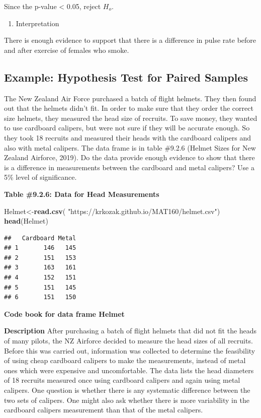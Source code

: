 \documentclass[
]{book}
\newenvironment{Shaded}{\begin{snugshade}}{\end{snugshade}}
\newcommand{\KeywordTok}[1]{\textcolor[rgb]{0.13,0.29,0.53}{\textbf{#1}}}
\newcommand{\NormalTok}[1]{#1}
\newcommand{\StringTok}[1]{\textcolor[rgb]{0.31,0.60,0.02}{#1}}
\providecommand{\tightlist}{%
  \setlength{\itemsep}{0pt}\setlength{\parskip}{0pt}}
\begin{document}
Since the p-value \textless{} 0.05, reject \(H_o\).

\begin{enumerate}
\def\labelenumi{\arabic{enumi}.}
\setcounter{enumi}{5}
\tightlist
\item
  Interpretation
\end{enumerate}

There is enough evidence to support that there is a difference in pulse rate before and after exercise of females who smoke.

\hypertarget{example-hypothesis-test-for-paired-samples-1}{%
\subsection{Example: Hypothesis Test for Paired Samples}\label{example-hypothesis-test-for-paired-samples-1}}

The New Zealand Air Force purchased a batch of flight helmets. They then found out that the helmets didn't fit. In order to make sure that they order the correct size helmets, they measured the head size of recruits. To save money, they wanted to use cardboard calipers, but were not sure if they will be accurate enough. So they took 18 recruits and measured their heads with the cardboard calipers and also with metal calipers. The data frame is in table \#9.2.6 (Helmet Sizes for New Zealand Airforce, 2019). Do the data provide enough evidence to show that there is a difference in measurements between the cardboard and metal calipers? Use a 5\% level of significance.

\textbf{Table \#9.2.6: Data for Head Measurements}

\begin{Shaded}
\begin{Highlighting}[]
\NormalTok{Helmet<-}\KeywordTok{read.csv}\NormalTok{(}
  \StringTok{"https://krkozak.github.io/MAT160/helmet.csv"}\NormalTok{)}
\KeywordTok{head}\NormalTok{(Helmet)}
\end{Highlighting}
\end{Shaded}

\begin{verbatim}
##   Cardboard Metal
## 1       146   145
## 2       151   153
## 3       163   161
## 4       152   151
## 5       151   145
## 6       151   150
\end{verbatim}

\textbf{Code book for data frame Helmet}

\textbf{Description}
After purchasing a batch of flight helmets that did not fit the heads of many pilots, the NZ Airforce decided to measure the head sizes of all recruits. Before this was carried out, information was collected to determine the feasibility of using cheap cardboard calipers to make the measurements, instead of metal ones which were expensive and uncomfortable. The data lists the head diameters of 18 recruits measured once using cardboard calipers and again using metal calipers. One question is whether there is any systematic difference between the two sets of calipers. One might also ask whether there is more variability in the cardboard calipers measurement than that of the metal calipers.
\end{document}
